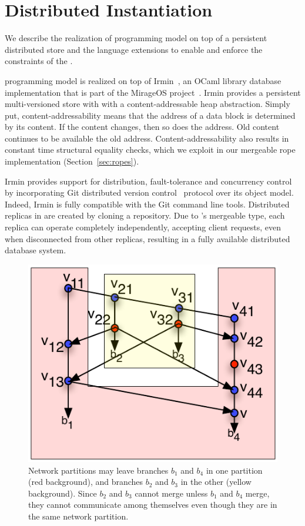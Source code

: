 \section{Distributed Instantiation}
\label{sec:implementation}

We describe the realization of \name programming model on top of a persistent
distributed store and the language extensions to enable and enforce the
constraints of the \name.

\name programming model is realized on top of Irmin~\cite{irmin}, an OCaml
library database implementation that is part of the MirageOS
project~\cite{mirage}. Irmin provides a persistent multi-versioned store with
with a content-addressable heap abstraction. Simply put, content-addressability
means that the address of a data block is determined by its content. If the
content changes, then so does the address. Old content continues to be
available the old address. Content-addressability also results in constant time
structural equality checks, which we exploit in our mergeable rope
implementation (Section~\ref{sec:ropes}).

Irmin provides support for distribution, fault-tolerance and concurrency
control by incorporating Git distributed version control~\cite{git} protocol
over its object model. Indeed, Irmin is fully compatible with the Git command
line tools. Distributed replicas in \name are created by cloning a \name
repository. Due to \name's mergeable type, each replica can operate completely
independently, accepting client requests, even when disconnected from other
replicas, resulting in a fully available distributed database system.

\begin{figure}
	\begin{center}
	\includegraphics[scale=0.8]{Figures/partitions}
	\end{center}
	\caption{Network partitions may leave branches $b_1$ and $b_4$ in one
		partition (red background), and branches $b_2$ and $b_3$ in the other
		(yellow background). Since $b_2$ and $b_3$ cannot merge unless $b_1$ and
		$b_4$ merge, they cannot communicate among themselves even though they are in
		the same network partition.}
	\label{fig:partitions}
\end{figure}

